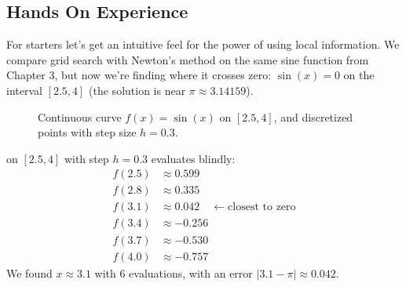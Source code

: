







\newpage
\subsection{Hands On Experience}

For starters let's get an intuitive feel for the power of using local information.
We compare grid search with Newton's method on the same sine function from Chapter 3, 
but now we're finding where it crosses zero: $\sin(x) = 0$ on the interval $[2.5, 4]$ 
(the solution is near $\pi \approx 3.14159$). 



\begin{figure}[h]
    \centering
    \caption{Continuous curve $f(x) = \sin(x)$ on $[2.5,4]$, and discretized points with step size $h=0.3$.}
    \label{fig:newton_sine_gridsearch}
\end{figure}

 on $[2.5, 4]$ with step $h = 0.3$ evaluates blindly:
\begin{align*}
    f(2.5) &\approx 0.599 \\
    f(2.8) &\approx 0.335 \\
    f(3.1) &\approx 0.042 \quad \leftarrow \text{closest to zero} \\
    f(3.4) &\approx -0.256 \\
    f(3.7) &\approx -0.530 \\
    f(4.0) &\approx -0.757
\end{align*}
We found $x \approx 3.1$ with 6 evaluations, with an error $|3.1 - \pi| \approx 0.042$.

